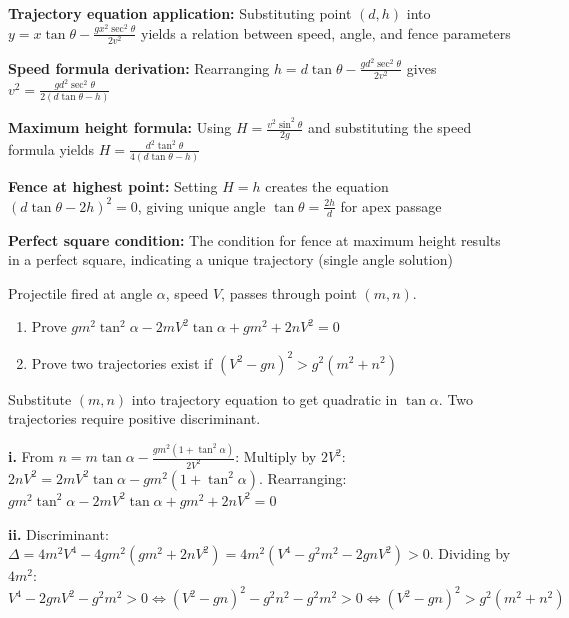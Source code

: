 \begin{takeaways}
\item \textbf{Trajectory equation application:} Substituting point $(d, h)$ into $y = x\tan\theta - \frac{gx^2\sec^2\theta}{2v^2}$ yields a relation between speed, angle, and fence parameters
\item \textbf{Speed formula derivation:} Rearranging $h = d\tan\theta - \frac{gd^2\sec^2\theta}{2v^2}$ gives $v^2 = \frac{gd^2\sec^2\theta}{2(d\tan\theta-h)}$
\item \textbf{Maximum height formula:} Using $H = \frac{v^2\sin^2\theta}{2g}$ and substituting the speed formula yields $H = \frac{d^2\tan^2\theta}{4(d\tan\theta-h)}$
\item \textbf{Fence at highest point:} Setting $H = h$ creates the equation $(d\tan\theta - 2h)^2 = 0$, giving unique angle $\tan\theta = \frac{2h}{d}$ for apex passage
\item \textbf{Perfect square condition:} The condition for fence at maximum height results in a perfect square, indicating a unique trajectory (single angle solution)
\end{takeaways}

\begin{problem}
Projectile fired at angle $\alpha$, speed $V$, passes through point $(m, n)$.
\begin{enumerate}[label=\textbf{\roman*.}]
    \item Prove $gm^2\tan^2\alpha - 2mV^2\tan\alpha + gm^2 + 2nV^2 = 0$
    \item Prove two trajectories exist if $(V^2 - gn)^2 > g^2(m^2 + n^2)$
\end{enumerate}
\end{problem}

\begin{hint}
Substitute $(m, n)$ into trajectory equation to get quadratic in $\tan\alpha$. Two trajectories require positive discriminant.
\end{hint}

\begin{solution}
\textbf{i.} From $n = m\tan\alpha - \frac{gm^2(1+\tan^2\alpha)}{2V^2}$: Multiply by $2V^2$: $2nV^2 = 2mV^2\tan\alpha - gm^2(1+\tan^2\alpha)$. Rearranging: $gm^2\tan^2\alpha - 2mV^2\tan\alpha + gm^2 + 2nV^2 = 0$ 

\textbf{ii.} Discriminant: $\Delta = 4m^2V^4 - 4gm^2(gm^2 + 2nV^2) = 4m^2(V^4 - g^2m^2 - 2gnV^2) > 0$. Dividing by $4m^2$: $V^4 - 2gnV^2 - g^2m^2 > 0 \Leftrightarrow (V^2-gn)^2 - g^2n^2 - g^2m^2 > 0 \Leftrightarrow (V^2-gn)^2 > g^2(m^2+n^2)$ 
\end{solution}

